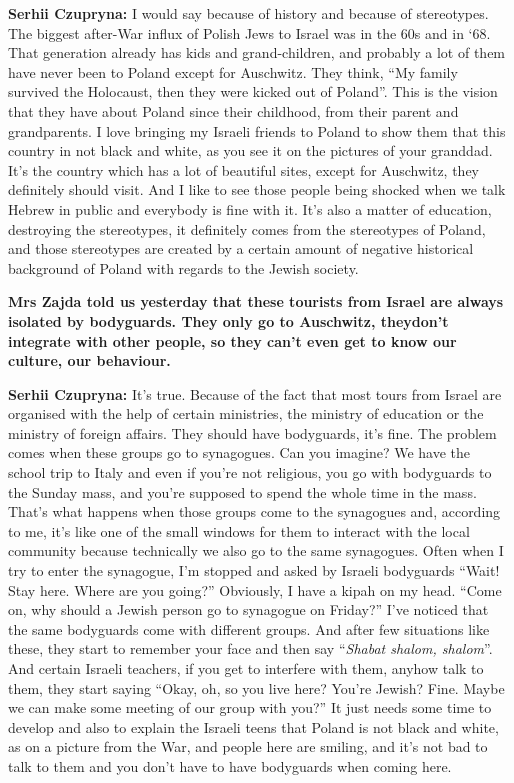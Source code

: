 \textbf{Serhii Czupryna:} I would say because of history and because of stereotypes. The biggest after-War influx of Polish Jews to Israel was in the 60s and in ‘68. That generation already has kids and grand-children, and probably a lot of them have never been to Poland except for Auschwitz. They think, “My family survived the Holocaust, then they were kicked out of Poland”. This is the vision that they have about Poland since their childhood, from their parent and grandparents. I love bringing my Israeli friends to Poland to show them that this country in not black and white, as you see it on the pictures of your granddad. It’s the country which has a lot of beautiful sites, except for Auschwitz, they definitely should visit. And I like to see those people being shocked when we talk Hebrew in public and everybody is fine with it. It’s also a matter of education, destroying the stereotypes, it definitely comes from the stereotypes of Poland, and those stereotypes are created by a certain amount of negative historical background of Poland with regards to the Jewish society.\par
\textbf{Mrs Zajda told us yesterday that these tourists from Israel are always isolated by bodyguards. They only go to Auschwitz,  theydon’t integrate with other people, so they can’t even get to know our culture, our behaviour.}\par
\textbf{Serhii Czupryna:} It’s true. Because of the fact that most tours from Israel are organised with the help of certain ministries, the ministry of education or the ministry of foreign affairs. They should have bodyguards, it’s fine. The problem comes when these groups go to synagogues. Can you imagine? We have the school trip to Italy and even if you’re not religious, you go with bodyguards to the Sunday mass, and you’re supposed to spend the whole time in the mass. That’s what happens when those groups come to the synagogues and, according to me, it’s like one of the small windows for them to interact with the local community because technically we also go to the same synagogues. Often when I try to enter the synagogue, I’m stopped and asked by Israeli bodyguards “Wait! Stay here. Where are you going?” Obviously, I have a kipah on my head. “Come on, why should a Jewish person go to synagogue on Friday?” I’ve noticed that the same bodyguards come with different groups. And after few situations like these, they start to remember your face and then say “\textit{Shabat shalom, shalom}”. And certain Israeli teachers, if you get to interfere with them, anyhow talk to them, they start saying “Okay, oh, so you live here? You’re Jewish? Fine. Maybe we can make some meeting of our group with you?” It just needs some time to develop and also to explain the Israeli teens that Poland is not black and white, as on a picture from the War, and people here are smiling, and it’s not bad to talk to them and you don’t have to have bodyguards when coming here.\par
